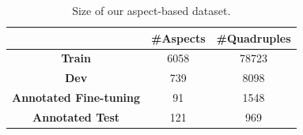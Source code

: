 \begin{table}[th]
\scriptsize
\centering
\begin{tabular}{ccc}
\toprule[1.5pt]
& \textbf{\#Aspects} & \textbf{\#Quadruples} \\ 
\midrule[1pt]
\textbf{Train} & 6058 & 78723 \\ 
\textbf{Dev} & 739 & 8098  \\ 
\textbf{Annotated Fine-tuning} & 91 & 1548 \\
\textbf{Annotated Test} &121& 969\\
\bottomrule[1.5pt]
\end{tabular}
\caption{\label{tab:size} Size of our aspect-based dataset.}
\end{table}


